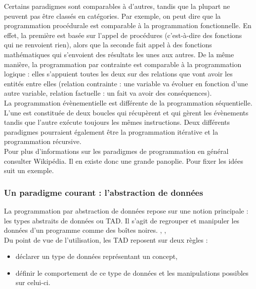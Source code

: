 Certains paradigmes sont comparables à d'autres, tandis que la plupart ne peuvent pas être classés en catégories. Par exemple, on peut dire que la programmation procédurale est comparable à la programmation fonctionnelle. En effet, la première est basée sur l'appel de procédures (c'est-à-dire des fonctions qui ne renvoient rien), alors que la seconde fait appel à des fonctions mathématiques qui s'envoient des résultats les unes aux autres. De la même manière, la programmation par contrainte est comparable à la programmation logique : elles s'appuient toutes les deux sur des relations que vont avoir les entités entre elles (relation contrainte : une variable va évoluer en fonction d'une autre variable, relation factuelle : un fait va avoir des conséquences).\\

La programmation évènementielle est différente de la programmation séquentielle. L'une est constituée de deux boucles qui récupèrent et qui gèrent les évènements tandis que l'autre exécute toujours les mêmes instructions. Deux différents paradigmes pourraient également être la programmation itérative et la programmation récursive.\\

Pour plus d'informations sur les paradigmes de programmation en général consulter Wikipédia. \cite{bib_wiki_paradigmes}
Il en existe donc une grande panoplie. Pour fixer les idées suit un exemple.

\subsubsection{Un paradigme courant : l'abstraction de données}

La programmation par abstraction de données repose sur une notion principale : les types abstraits de données ou TAD. Il s'agit de regrouper et manipuler les données d'un programme comme des boîtes noires. \cite{bib_dchaffiol1}, \cite{bib_dchaffiol2}, \cite{bib_wiki_adt}\\

Du point de vue de l'utilisation, les TAD reposent sur deux règles \cite{bib_reunion} :
\begin{itemize}
\item déclarer un type de données représentant un concept,
\item définir le comportement de ce type de données et les manipulations possibles sur celui-ci.\\
\end{itemize}

